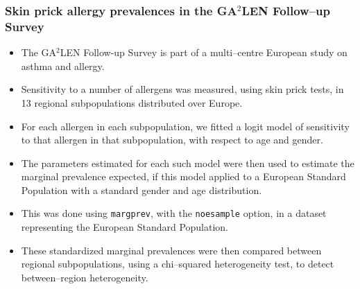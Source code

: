 \documentclass[11pt]{beamer}
\begin{document}
\begin{frame}
\frametitle{Skin prick allergy prevalences in the GA$^2$LEN Follow--up Survey}

\begin{itemize}

\item<2-> The GA$^2$LEN Follow-up Survey is part of a multi--centre European study on asthma and allergy.

\item<3-> Sensitivity to a number of allergens was measured, using skin prick tests,
in 13 regional subpopulations distributed over Europe.

\item<4-> For each allergen in each subpopulation,
we fitted a logit model of sensitivity to that allergen in that subpopulation,
with respect to age and gender.

\item<5-> The parameters estimated for each such model were then used to estimate the marginal prevalence
expected, if this model applied to a European Standard Population with a standard gender and age distribution.

\item<6-> This was done using \texttt{margprev}, with the \texttt{noesample} option,
in a dataset representing the European Standard Population.

\item<7-> These standardized marginal prevalences were then compared between regional subpopulations,
using a chi--squared heterogeneity test, to detect between--region heterogeneity.

\end{itemize}

\end{frame}
\end{document}
